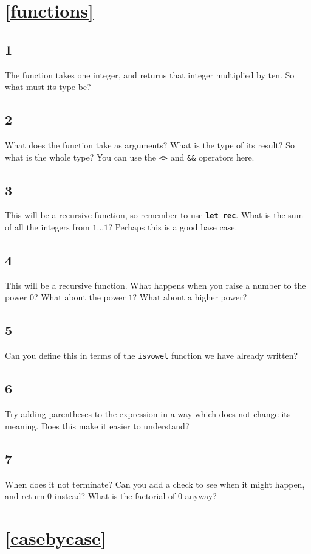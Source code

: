 \documentclass[]{book}
\begin{document}
\section*{\ref{functions}\\ }
\subsection*{1}
The function takes one integer, and returns that integer multiplied by ten. So what must its type be?
\subsection*{2}
What does the function take as arguments? What is the type of its result? So what is the whole type? You can use the \texttt{<>} and \texttt{\&\&} operators here.
\subsection*{3}
This will be a recursive function, so remember to use \texttt{\textbf{let rec}}. What is the sum of all the integers from $1\ldots 1$? Perhaps this is a good base case. 
\subsection*{4}
This will be a recursive function. What happens when you raise a number to the power $0$? What about the power $1$? What about a higher power?
\subsection*{5}
Can you define this in terms of the \texttt{isvowel} function we have already written?
\subsection*{6}
Try adding parentheses to the expression in a way which does not change its meaning. Does this make it easier to understand?
\subsection*{7}
When does it not terminate? Can you add a check to see when it might happen, and return $0$ instead? What is the factorial of $0$ anyway?
\section*{\ref{casebycase}\\ }
\end{document}
